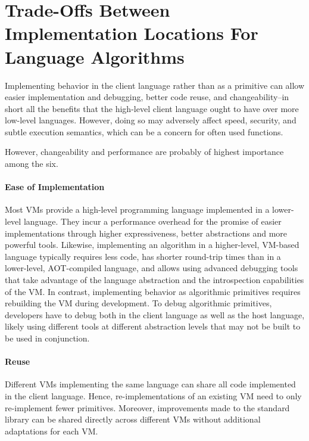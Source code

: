 \documentclass[
10pt,          %
]{sigplanconf}
\begin{document}
\section{Trade-Offs Between Implementation Locations For Language Algorithms}
\label{sec:trade-offs-between}

Implementing behavior in the client language rather than as a primitive can
allow easier implementation and debugging, better code reuse, and
changeability\---in short all the benefits that the high-level client language
ought to have over more low-level languages. However, doing so may adversely
affect speed, security, and subtle execution semantics, which can be a concern
for often used functions.

However, changeability and performance are probably of highest importance among
the six.

\paragraph{Ease of Implementation}
Most \acp{VM} provide a high-level programming language implemented in a
lower-level language. They incur a performance overhead for the promise of
easier implementations through higher expressiveness, better abstractions and
more powerful tools. Likewise, implementing an algorithm in a higher-level,
\ac{VM}-based language typically requires less code, has shorter
round-trip times than in a lower-level, \ac{AOT}-compiled language, and allows
using advanced debugging tools that take advantage of the language abstraction
and the introspection capabilities of the \ac{VM}. In contrast, implementing
behavior as algorithmic primitives requires rebuilding the \ac{VM} during
development. To debug algorithmic primitives, developers have to debug both in
the client language as well as the host language, likely using different tools
at different abstraction levels that may not be built to be used in
conjunction.

\paragraph{Reuse}
Different \acp{VM} implementing the same language can share all code
implemented in the client language. Hence, re-implementations
of an existing \ac{VM} need to only re-implement fewer primitives. Moreover,
improvements made to the standard library can be shared directly across
different \acp{VM} without additional adaptations for each \ac{VM}.
\end{document}
